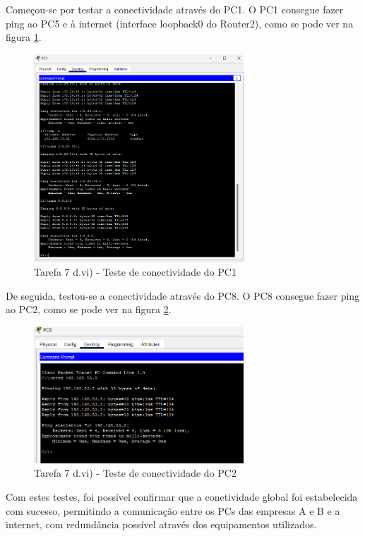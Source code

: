 \documentclass[11pt,english, openright, oneside]{book}
\begin{document}
\begin{enumerate}[label=\Roman*.]
    \par Começou-se por testar a conectividade através do PC1. O PC1 consegue fazer ping ao PC5 e à internet (interface loopback0 do Router2), como se pode ver na figura \ref{fig:7.d.7.1}.
    \vspace{0.2cm}

    \begin{figure}[H]
        \centering
        \includegraphics[width=0.7\textwidth]{imagens/Tarefa7/7.d_7_PC1.png}
        \caption{Tarefa 7 d.vi) - Teste de conectividade do PC1}
        \label{fig:7.d.7.1}
    \end{figure}
    \vspace{0.2cm}

    \par De seguida, testou-se a conectividade através do PC8. O PC8 consegue fazer ping ao PC2, como se pode ver na figura \ref{fig:7.d.7.2}.
    \vspace{0.2cm}

    \begin{figure}[H]
        \centering
        \includegraphics[width=0.7\textwidth]{imagens/Tarefa7/7.d_7_PC8.png}
        \caption{Tarefa 7 d.vi) - Teste de conectividade do PC2}
        \label{fig:7.d.7.2}
    \end{figure}
    \vspace{0.2cm}

    \par Com estes testes, foi possível confirmar que a conetividade global foi estabelecida com sucesso, permitindo a comunicação entre os PCs das empresas A e B e a internet, com redundância possível através dos equipamentos utilizados.
\end{enumerate}
\end{document}
